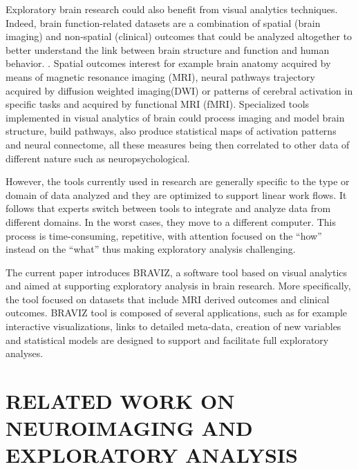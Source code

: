 \documentclass[twocolumn]{svjour3}
\begin{document}
Exploratory brain research  could also benefit from visual analytics techniques. Indeed, brain function-related datasets are a combination of spatial (brain imaging) and non-spatial (clinical) outcomes that could be analyzed altogether to better understand the link between brain structure and function and human behavior. . Spatial outcomes interest for example brain anatomy acquired by means of magnetic resonance imaging (MRI), neural pathways trajectory acquired by diffusion weighted imaging(DWI) or patterns of cerebral activation in specific tasks and acquired by functional MRI (fMRI). Specialized tools implemented in visual analytics of brain could process imaging and model brain structure, build pathways, also produce statistical maps of activation patterns and neural connectome, all these measures being then correlated to other data of different nature such as neuropsychological.

However, the tools currently used in research are generally specific to the type or domain of data analyzed and they are optimized to support linear work flows. It follows that experts switch between tools to integrate and analyze data from different domains. In the worst cases, they move to a different computer. This process is time-consuming, repetitive, with attention focused on the ``how'' instead on the ``what'' thus making exploratory analysis challenging.

The current paper introduces BRAVIZ, a software tool based on visual analytics and aimed at supporting exploratory analysis in brain research. More specifically, the tool focused on datasets that include MRI derived outcomes and clinical outcomes. BRAVIZ tool is composed of several applications, such as for example interactive visualizations, links to detailed meta-data, creation of new variables and statistical models are designed to support and facilitate full exploratory analyses.  

\section{RELATED WORK ON NEUROIMAGING AND EXPLORATORY ANALYSIS }
\end{document}
